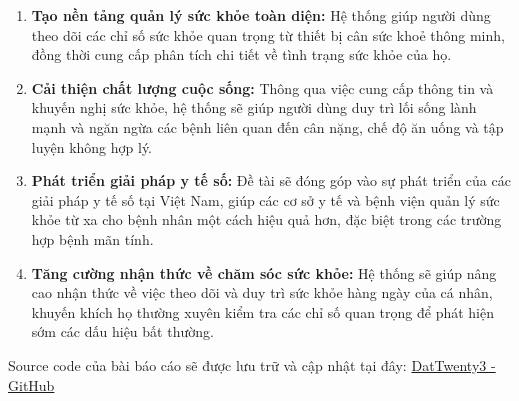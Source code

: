 \begin{enumerate}
    \item \textbf{Tạo nền tảng quản lý sức khỏe toàn diện:} Hệ thống giúp người dùng theo dõi các chỉ số sức khỏe quan trọng từ thiết bị cân sức khoẻ thông minh, đồng thời cung cấp phân tích chi tiết về tình trạng sức khỏe của họ.
    \item \textbf{Cải thiện chất lượng cuộc sống:} Thông qua việc cung cấp thông tin và khuyến nghị sức khỏe, hệ thống sẽ giúp người dùng duy trì lối sống lành mạnh và ngăn ngừa các bệnh liên quan đến cân nặng, chế độ ăn uống và tập luyện không hợp lý.
    \item \textbf{Phát triển giải pháp y tế số:} Đề tài sẽ đóng góp vào sự phát triển của các giải pháp y tế số tại Việt Nam, giúp các cơ sở y tế và bệnh viện quản lý sức khỏe từ xa cho bệnh nhân một cách hiệu quả hơn, đặc biệt trong các trường hợp bệnh mãn tính.
    \item \textbf{Tăng cường nhận thức về chăm sóc sức khỏe:} Hệ thống sẽ giúp nâng cao nhận thức về việc theo dõi và duy trì sức khỏe hàng ngày của cá nhân, khuyến khích họ thường xuyên kiểm tra các chỉ số quan trọng để phát hiện sớm các dấu hiệu bất thường.
\end{enumerate}

Source code của bài báo cáo sẽ được lưu trữ và cập nhật tại đây: \href{https://github.com/DatTwenty3/xiaomi_smart_scale_2}{DatTwenty3 - GitHub}